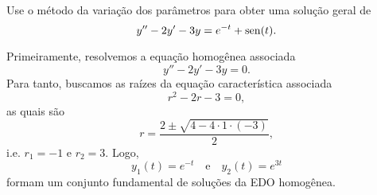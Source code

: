 \begin{exeresol}\label{exeresol:ed2o_nh_vp}
  Use o método da variação dos parâmetros para obter uma solução geral de
  \begin{equation}
    y'' - 2y' - 3y = e^{-t}+\operatorname{sen}(t).
  \end{equation}
\end{exeresol}
\begin{resol}
  Primeiramente, resolvemos a equação homogênea associada
  \begin{equation}
    y'' - 2y' - 3y = 0.
  \end{equation}
  Para tanto, buscamos as raízes da equação característica associada
  \begin{equation}
    r^2 - 2r - 3 = 0,
  \end{equation}
  as quais são
  \begin{equation}
    r = \frac{2 \pm \sqrt{4 - 4\cdot 1\cdot (-3)}}{2},
  \end{equation}
  i.e. $r_1 = -1$ e $r_2 = 3$. Logo,
  \begin{equation}
    y_1(t) = e^{-t}\quad\text{e}\quad y_2(t) = e^{3t}
  \end{equation}
  formam um conjunto fundamental de soluções da EDO homogênea.


\end{resol}
